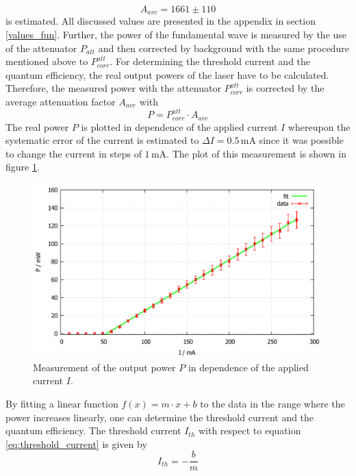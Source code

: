 \documentclass[10pt, a4paper, notitlepage, DIV=15]{scrartcl}
\begin{document}
\begin{equation}
	A_{ave}=1661\pm 110
\end{equation}
is estimated. All discussed values are presented in the appendix in section \ref{values_fun}. \newline
Further, the power of the fundamental wave is measured by the use of the attenuator $P_{att}$ and then corrected by background with the same procedure mentioned above to $P_{corr}^{att}$. For determining the threshold current and the quantum efficiency, the real output powers of the laser have to be calculated. Therefore, the measured power with the attenuator $P_{corr}^{att}$ is corrected by the average attenuation factor $A_{ave}$ with
\begin{equation}
	P=P_{corr}^{att}\cdot A_{ave}
\end{equation}
The real power $P$ is plotted in dependence of the applied current $I$ whereupon the systematic error of the current is estimated to $\Delta I = 0.5\,$mA since it was possible to change the current in steps of $1\,$mA. The plot of this measurement is shown in figure \ref{fig:output_pow_current}.
\begin{figure}[h]
	\centering
	\includegraphics[width=1\textwidth]{Gnuplot/fun_current}
	\caption{Measurement of the output power $P$ in dependence of the applied current $I$.}
	\label{fig:output_pow_current}
\end{figure}
\newline
By fitting a linear function $f(x)=m\cdot x +b$ to the data in the range where the power increases linearly, one can determine the threshold current and the quantum efficiency. The threshold current $I_{th}$ with respect to equation \ref{eq:threshold_current} is given by
\begin{equation}
I_{th}= - \frac{b}{m}
\end{equation}
\end{document}
